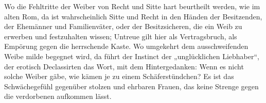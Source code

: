 Wo die Fehltritte der Weiber von Recht und Sitte hart beurtheilt werden, wie im alten Rom, da ist wahrscheinlich Sitte und Recht in den Händen der Besitzenden, der Ehemänner und Familienväter, oder der Besitzsicheren, die ein Weib zu erwerben und festzuhalten wissen; Untreue gilt hier als Vertragsbruch, als Empörung gegen die herrschende Kaste. Wo umgekehrt dem ausschweifenden Weibe milde begegnet wird, da führt der Instinct der „unglücklichen Liebhaber“, der erotisch Declassirten das Wort, mit dem Hintergedanken: Wenn es nicht solche Weiber gäbe, wie kämen  je zu einem Schäferstündchen? Es ist das Schwächegefühl gegenüber stolzen und ehrbaren Frauen, das keine Strenge gegen die verdorbenen aufkommen lässt.
\par

